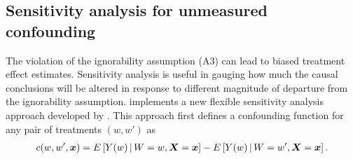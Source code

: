 \begin{Schunk}
\end{Schunk}




\subsection{Sensitivity analysis for unmeasured confounding}\label{sec:sa}
The violation of the ignorability assumption (A3) can lead to biased treatment effect estimates. Sensitivity analysis is useful in gauging how much the causal conclusions will be altered in response to different magnitude of departure from the ignorability assumption.  implements a new flexible sensitivity analysis approach developed by \cite{hu2022flexible}. This approach first defines a confounding function for any pair of treatments $(w, w')$ as
\begin{eqnarray} \label{eq:cf}
c(w, w', \bm{x}) = E \left[ Y(w) {\, \vert \,} W = w, \bm{X}=\bm{x}\right] - E \left[ Y (w) {\, \vert \,} W =w', \bm{X}=\bm{x} \right].
\end{eqnarray} 

